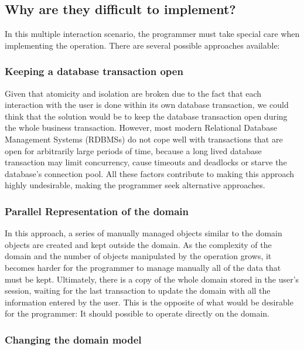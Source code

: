 \documentclass{llncs}
\begin{document}
\subsection{Why are they difficult to implement?}
\label{sec:difficult}

In this multiple interaction scenario, the programmer must take
special care when implementing the operation. There are several
possible approaches available:

\subsubsection{Keeping a database transaction open}

Given that atomicity and isolation are broken due to the fact that
each interaction with the user is done within its own database
transaction, we could think that the solution would be to keep the
database transaction open during the whole business
transaction. However, most modern Relational Database Management
Systems (RDBMSs) do not cope well with transactions that are open for
arbitrarily large periods of time, because a long lived database
transaction may limit concurrency, cause timeouts and deadlocks or
starve the database's connection pool. All these factors contribute to
making this approach highly undesirable, making the programmer seek
alternative approaches.

\subsubsection{Parallel Representation of the domain}

In this approach, a series of manually managed objects similar to the
domain objects are created and kept outside the domain. As the
complexity of the domain and the number of objects manipulated by the
operation grows, it becomes harder for the programmer to manage
manually all of the data that must be kept. Ultimately, there is a
copy of the whole domain stored in the user's session, waiting for the
last transaction to update the domain with all the information entered
by the user. This is the opposite of what would be desirable for the
programmer: It should possible to operate directly on the domain.

\subsubsection{Changing the domain model}
\end{document}
